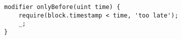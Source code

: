\begin{lstlisting}[language=Solidity]
modifier onlyBefore(uint time) {
	require(block.timestamp < time, 'too late');
	_;
}
\end{lstlisting}